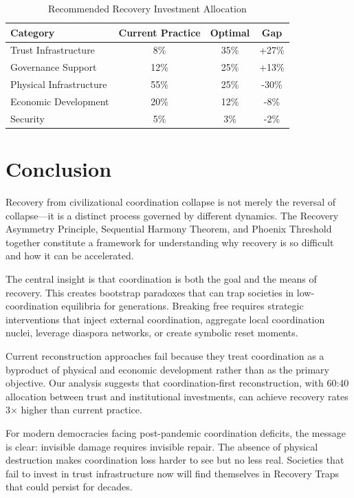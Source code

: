 \documentclass[11pt,letterpaper]{article}
\begin{document}
\begin{table}[H]
\centering
\caption{Recommended Recovery Investment Allocation}
\begin{tabular}{lccc}
\toprule
\textbf{Category} & \textbf{Current Practice} & \textbf{Optimal} & \textbf{Gap} \\
\midrule
Trust Infrastructure & 8\% & 35\% & +27\% \\
Governance Support & 12\% & 25\% & +13\% \\
Physical Infrastructure & 55\% & 25\% & -30\% \\
Economic Development & 20\% & 12\% & -8\% \\
Security & 5\% & 3\% & -2\% \\
\bottomrule
\end{tabular}
\label{tab:allocation}
\end{table}

\section{Conclusion}

Recovery from civilizational coordination collapse is not merely the reversal of collapse---it is a distinct process governed by different dynamics. The Recovery Asymmetry Principle, Sequential Harmony Theorem, and Phoenix Threshold together constitute a framework for understanding why recovery is so difficult and how it can be accelerated.

The central insight is that coordination is both the goal and the means of recovery. This creates bootstrap paradoxes that can trap societies in low-coordination equilibria for generations. Breaking free requires strategic interventions that inject external coordination, aggregate local coordination nuclei, leverage diaspora networks, or create symbolic reset moments.

Current reconstruction approaches fail because they treat coordination as a byproduct of physical and economic development rather than as the primary objective. Our analysis suggests that coordination-first reconstruction, with 60:40 allocation between trust and institutional investments, can achieve recovery rates 3$\times$ higher than current practice.

For modern democracies facing post-pandemic coordination deficits, the message is clear: invisible damage requires invisible repair. The absence of physical destruction makes coordination loss harder to see but no less real. Societies that fail to invest in trust infrastructure now will find themselves in Recovery Traps that could persist for decades.
\end{document}

